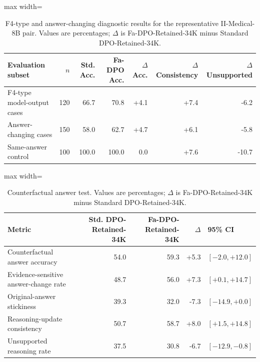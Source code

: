 \documentclass[a4paper,fleqn,doubleblind]{cas-sc}
\begin{document}
\begin{table}[htbp]
    \centering
    \begingroup\color{blue}
    \footnotesize
    \caption{F4-type and answer-changing diagnostic results for the representative II-Medical-8B pair. Values are percentages; $\Delta$ is Fa-DPO-Retained-34K minus Standard DPO-Retained-34K.}
    \label{tab:answer_changing_diagnostic}
    \begin{adjustbox}{max width=\textwidth}
    \begin{tabular}{lrrrrrr}
        \toprule
        \textbf{Evaluation subset} & \textbf{$n$} & \textbf{Std. Acc.} & \textbf{Fa-DPO Acc.} & \textbf{$\Delta$ Acc.} & \textbf{$\Delta$ Consistency} & \textbf{$\Delta$ Unsupported} \\
        \midrule
        F4-type model-output cases & 120 & 66.7 & 70.8 & +4.1 & +7.4 & -6.2 \\
        Answer-changing cases & 150 & 58.0 & 62.7 & +4.7 & +6.1 & -5.8 \\
        Same-answer control & 100 & 100.0 & 100.0 & 0.0 & +7.6 & -10.7 \\
        \bottomrule
    \end{tabular}
    \end{adjustbox}
    \endgroup
\end{table}

\begin{table}[htbp]
    \centering
    \begingroup\color{blue}
    \footnotesize
    \caption{Counterfactual answer test. Values are percentages; $\Delta$ is Fa-DPO-Retained-34K minus Standard DPO-Retained-34K.}
    \label{tab:counterfactual_answer_test}
    \begin{adjustbox}{max width=\columnwidth}
    \begin{tabular}{lrrrl}
        \toprule
        \textbf{Metric} & \textbf{Std. DPO-Retained-34K} & \textbf{Fa-DPO-Retained-34K} & \textbf{$\Delta$} & \textbf{95\% CI} \\
        \midrule
        Counterfactual answer accuracy & 54.0 & 59.3 & +5.3 & $[-2.0,+12.0]$ \\
        Evidence-sensitive answer-change rate & 48.7 & 56.0 & +7.3 & $[+0.1,+14.7]$ \\
        Original-answer stickiness & 39.3 & 32.0 & -7.3 & $[-14.9,+0.0]$ \\
        Reasoning-update consistency & 50.7 & 58.7 & +8.0 & $[+1.5,+14.8]$ \\
        Unsupported reasoning rate & 37.5 & 30.8 & -6.7 & $[-12.9,-0.8]$ \\
        \bottomrule
    \end{tabular}
    \end{adjustbox}
    \endgroup
\end{table}
\end{document}
